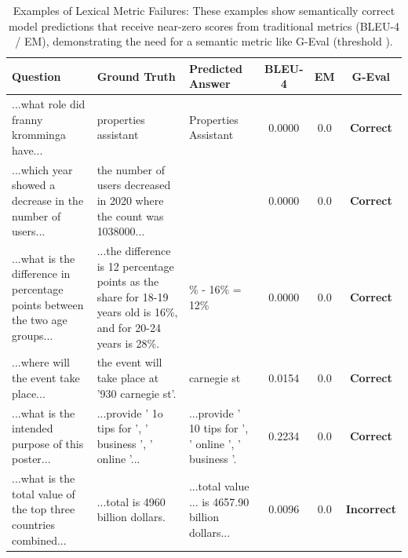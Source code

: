 \begin{table}[H]
\centering
\renewcommand{\arraystretch}{1.3}


\begin{tabularx}{\linewidth}{@{} >{\raggedright\arraybackslash}X >{\raggedright\arraybackslash}X >{\raggedright\arraybackslash}X c c c @{}}
\toprule
\textbf{Question} & \textbf{Ground Truth} & \textbf{Predicted Answer} & \textbf{BLEU-4} & \textbf{EM} & \textbf{G-Eval} \\
\midrule

...what role did franny kromminga have...
& properties assistant
& Properties Assistant 
& 0.0000 & 0.0 & \textbf{Correct}
\\

...which year showed a decrease in the number of users...
& the number of users decreased in 2020 where the count was 1038000...
& 2020
& 0.0000 & 0.0 & \textbf{Correct}
\\

...what is the difference in percentage points between the two age groups...
& ...the difference is 12 percentage points as the share for 18-19 years old is 16\%, and for 20-24 years is 28\%.
& 28\% - 16\% = 12\%
& 0.0000 & 0.0 & \textbf{Correct}
\\

...where will the event take place...
& the event will take place at '930 carnegie st'.
& 930 carnegie st
& 0.0154 & 0.0 & \textbf{Correct}
\\

...what is the intended purpose of this poster...
& ...provide ' 1o tips for ', ' business ', ' online '...
& ...provide ' 10 tips for ', ' online ', ' business '.
& 0.2234 & 0.0 & \textbf{Correct}
\\

...what is the total value of the top three countries combined...
& ...total is 4960 billion dollars.
& ...total value ... is 4657.90 billion dollars...
& 0.0096 & 0.0 & \textbf{Incorrect}
\\

\bottomrule

\end{tabularx}
\caption{
    Examples of Lexical Metric Failures:
    These examples show semantically correct model predictions that receive near-zero scores from
    traditional metrics (BLEU-4 / EM), demonstrating the need for a semantic metric like G-Eval (threshold  ).
}
\label{tab:geval_failures}

\end{table}

